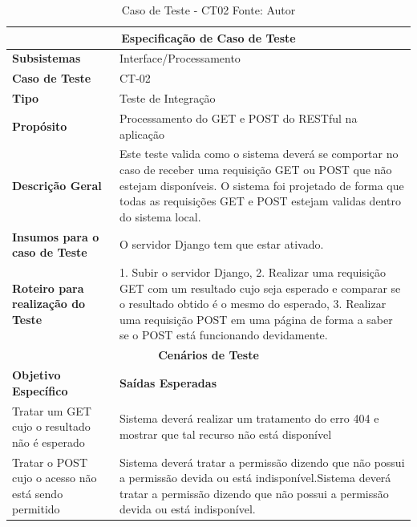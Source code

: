 \begin{table}[H]
    \begin{center}
        \begin{tabular}{|p{5cm}|p{12cm}|}
            \hline
            \multicolumn{2}{|c|}{\textbf{Especificação de Caso de Teste}} \\ \hline
                \textbf{Subsistemas}                               & Interface/Processamento \\ \hline
                \textbf{Caso de Teste}                             & CT-02 \\ \hline
                \textbf{Tipo}                                             & Teste de Integração \\ \hline
                \textbf{Propósito}                                     & Processamento do GET e POST do RESTful na aplicação \\ \hline
                \textbf{Descrição Geral}                           & Este teste valida como o sistema deverá se comportar no caso de receber uma requisição GET ou POST que não estejam disponíveis. O sistema foi projetado de forma que todas as requisições GET e POST estejam validas dentro do sistema local. \\ \hline
                \textbf{Insumos para o caso de Teste}    & O servidor Django tem que estar ativado. \\ \hline
                \textbf{Roteiro para realização do Teste}&  1. Subir o servidor Django, 2. Realizar uma requisição GET com um resultado cujo seja esperado e comparar se o resultado obtido é o mesmo do esperado, 3. Realizar uma requisição POST em uma página de forma a saber se o POST está funcionando devidamente. \\ \hline
            \multicolumn{2}{|c|}{\textbf{Cenários de Teste}} \\ \hline
                \textbf{Objetivo Específico}                      & \textbf{Saídas Esperadas} \\ \hline
                Tratar um GET cujo o resultado não é esperado & Sistema deverá realizar um tratamento do erro 404 e mostrar que tal recurso não está disponível \\ \hline
                Tratar o POST cujo o acesso não está sendo permitido & Sistema deverá tratar a permissão dizendo que não possui a permissão devida ou está indisponível.Sistema deverá tratar a permissão dizendo que não possui a permissão devida ou está indisponível. \\ \hline
        \end{tabular}
    \end{center}
    \caption[Caso de Teste - CT02]{Caso de Teste - CT02
    \protect Fonte: Autor}
    \label{CT-02}
\end{table}

